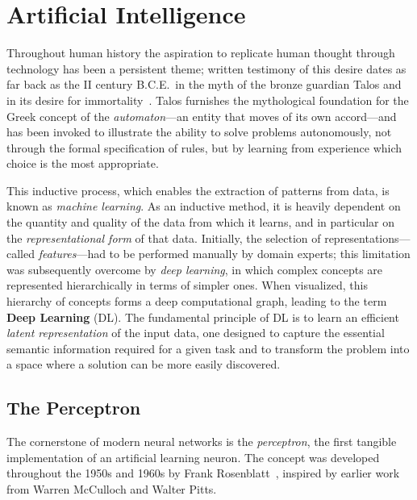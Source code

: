 \section{Artificial Intelligence}
\label{sec:bg-ai}

Throughout human history the aspiration to replicate human thought through
technology has been a persistent theme; written testimony of this desire dates
as far back as the II century B.C.E.\ in the myth of the bronze guardian Talos
and in its desire for immortality~\cite{talos}.
Talos furnishes the mythological foundation for the Greek concept of the
\emph{automaton}---an entity that moves of its own accord---and has been
invoked to illustrate the ability to solve problems autonomously, not through
the formal specification of rules, but by learning from experience which
choice is the most appropriate.

This inductive process, which enables the extraction of patterns from data,
is known as \emph{machine learning}.
As an inductive method, it is heavily dependent on the quantity and quality of
the data from which it learns, and in particular on the
\emph{representational form} of that data.
Initially, the selection of representations---called \emph{features}---had to
be performed manually by domain experts; this limitation was
subsequently overcome by \emph{deep learning},
in which complex concepts are represented hierarchically in terms of simpler
ones.
When visualized, this hierarchy of concepts forms a deep computational graph,
leading to the term \textbf{Deep Learning} (DL).
The fundamental principle of DL is to learn an efficient \emph{latent
representation} of the input data, one designed to capture the essential
semantic information required for a given task and to transform the problem
into a space where a solution can be more easily discovered.


\subsection{The Perceptron}
\label{sec:perceptron}

The cornerstone of modern neural networks is the \emph{perceptron}, the first
tangible implementation of an artificial learning neuron.
The concept was developed throughout the 1950s and 1960s by Frank
Rosenblatt~\cite{perceptron}, inspired by earlier work from Warren McCulloch
and Walter Pitts.

